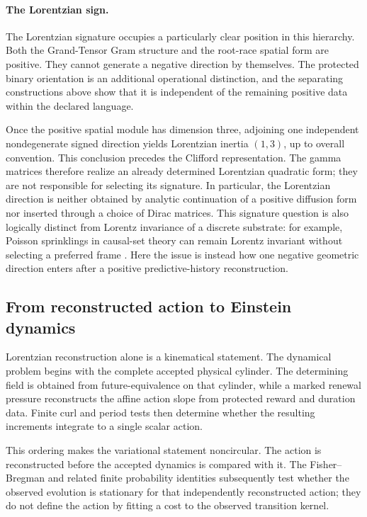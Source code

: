 \documentclass[11pt]{article}
\numberwithin{equation}{section}
\theoremstyle{definition}
\theoremstyle{remark}
\begin{document}
\paragraph{The Lorentzian sign.}

The Lorentzian signature occupies a particularly clear position in this
hierarchy.  Both the Grand-Tensor Gram structure and the root-race spatial
form are positive.  They cannot generate a negative direction by themselves.
The protected binary orientation is an additional operational distinction,
and the separating constructions above show that it is independent of the
remaining positive data within the declared language.

Once the positive spatial module has dimension three, adjoining one
independent nondegenerate signed direction yields Lorentzian inertia
$(1,3)$, up to overall convention.  This conclusion precedes the Clifford
representation.  The gamma matrices therefore realize an already determined
Lorentzian quadratic form; they are not responsible for selecting its
signature.  In particular, the Lorentzian direction is neither obtained by
analytic continuation of a positive diffusion form nor inserted through a
choice of Dirac matrices.  This signature question is also logically distinct
from Lorentz invariance of a discrete substrate: for example, Poisson
sprinklings in causal-set theory can remain Lorentz invariant without
selecting a preferred frame \cite{BombelliHensonSorkin2009}.  Here the issue is
instead how one negative geometric direction enters after a positive
predictive-history reconstruction.


\subsection{From reconstructed action to Einstein dynamics}

Lorentzian reconstruction alone is a kinematical statement.  The dynamical
problem begins with the complete accepted physical cylinder.  The determining
field is obtained from future-equivalence on that cylinder, while a marked
renewal pressure reconstructs the affine action slope from protected reward
and duration data.  Finite curl and period tests then determine whether the
resulting increments integrate to a single scalar action.

This ordering makes the variational statement noncircular.  The action is
reconstructed before the accepted dynamics is compared with it.  The
Fisher--Bregman and related finite probability identities subsequently test
whether the observed evolution is stationary for that independently
reconstructed action; they do not define the action by fitting a cost to the
observed transition kernel.
\end{document}
